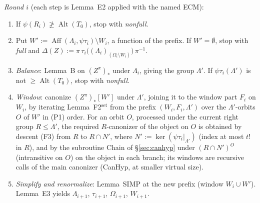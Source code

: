 \documentclass[11pt]{article}
\newenvironment{enumlab}[2][]{\begin{enumerate}\renewcommand{\theenumi}{#1#2{enumi}}%
  \renewcommand{\labelenumi}{(\theenumi)}}{\end{enumerate}}
\theoremstyle{plain}
\theoremstyle{definition}
\theoremstyle{remark}
\theoremstyle{named}
\theoremstyle{namedrm}
\newcommand{\Alt}{\operatorname{Alt}}
\newcommand{\Aff}{\operatorname{Aff}}
\begin{document}
\emph{Round $i$} (each step is Lemma~E2 applied with the named ECM):
\begin{enumlab}{\alph}
\item If $\psi(R_i)\not\ge\Alt(T_0)$, stop with \emph{nonfull}.
\item Put $W':=\Aff(\Lambda_i,\psi\tau_i)\setminus W_i$, a function of the prefix. If $W'=\emptyset$, stop with \emph{full}
  and $\Delta(Z):=\pi\,\tau_i\big((\Lambda_i)_{(\Omega_i\setminus W_i)}\big)\,\pi^{-1}$.
\item \emph{Balance}: Lemma~B on $(Z^\pi)_*$ under $\Lambda_i$, giving the group $\Lambda'$. If $\psi\tau_i(\Lambda')$ is not
  $\ge\Alt(T_0)$, stop with \emph{nonfull}.
\item \emph{Window}: canonize $(Z^\pi)_*[W']$ under $\Lambda'$, joining it to the window part $F_i$ on $W_i$, by iterating
  Lemma~F2$^{\text{set}}$ from the prefix $(W_i,F_i,\Lambda')$ over the $\Lambda'$-orbits $O$ of $W'$ in (P1) order. For an
  orbit $O$, processed under the current right group $R\le\Lambda'$, the required $R$-canonizer of the object on $O$ is
  obtained by descent (F3) from $R$ to $R\cap N'$, where $N':=\ker(\psi\tau_i|_{\Lambda'})$ (index at most $t!$ in $R$), and
  by the subroutine Chain of \S\ref{sec:canhyp} under $(R\cap N')^O$ (intransitive on $O$) on the object in each
  branch; its windows are recursive calls of the main canonizer (CanHyp, at smaller virtual size).
\item \emph{Simplify and renormalize}: Lemma~SIMP at the new prefix (window $W_i\cup W'$). Lemma~E3 yields
  $\Lambda_{i+1}$, $\tau_{i+1}$, $\Omega_{i+1}$, $W_{i+1}$.
\end{enumlab}
\end{document}
